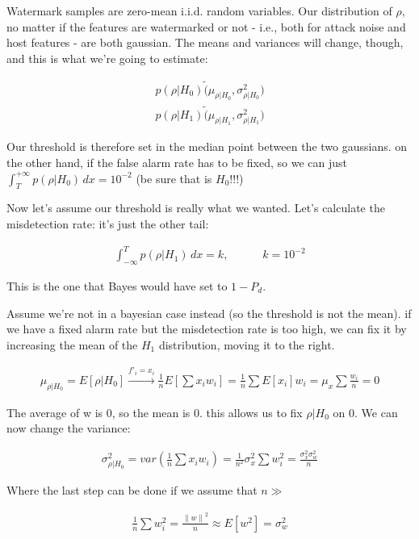 \documentclass[a4paper,11pt,hidelinks]{article}
\begin{document}
Watermark samples are zero-mean i.i.d. random variables. Our distribution of $\rho$, no matter if the features are watermarked or not - i.e., both for attack noise and host features - are both gaussian. The means and variances will change, though, and this is what we're going to estimate:

\begin{align}
    p(\rho|H_0) \tilde (\mu_{\rho|H_0}, \sigma^2_{\rho|H_0}) \\
    p(\rho|H_1) \tilde (\mu_{\rho|H_1}, \sigma^2_{\rho|H_1})
\end{align}

Our threshold is therefore set in the median point between the two gaussians. on the other hand, if the false alarm rate has to be fixed, so we can just $\int_{T}^{+\infty} p(\rho|H_0) \,dx = 10^{-2} $ (be sure that is $H_0$!!!)

Now let's assume our threshold is really what we wanted. Let's calculate the misdetection rate: it's just the other tail:

\begin{align}
    \int_{-\infty}^{T} p(\rho|H_1) \,dx = k, \quad\quad\quad k = 10^{-2} 
\end{align}

This is the one that Bayes would have set to $1 - P_d$.

Assume we're not in a bayesian case instead (so the threshold is not the mean). if we have a fixed alarm rate but the misdetection rate is too high, we can fix it by increasing the mean of the $H_1$ distribution, moving it to the right.

\begin{align}
    \mu_{\rho|H_0} = E[\rho|H_0] \xrightarrow{f'_i = x_i} \frac{1}{n} E[\sum x_i w_i] = \frac{1}{n} \sum E[x_i] w_i = \mu_x \sum \frac{w_i}{n} = 0
\end{align}

The average of w is 0, so the mean is 0. this allows us to fix $\rho|H_0$ on 0. We can now change the variance:

\begin{align}
    \sigma^2_{\rho|H_0} = var(\frac{1}{n} \sum x_i w_i) = \frac{1}{n^2} \sigma_x^2 \sum w_i^2 = \frac{\sigma_x^2 \sigma_w^2}{n}
\end{align}

Where the last step can be done if we assume that $n \gg $

\begin{align}
    \frac{1}{n} \sum w_i^2 = \frac{\left\lVert w \right\rVert^2}{n} \approx E[w^2] = \sigma^2_w
\end{align}
\end{document}
